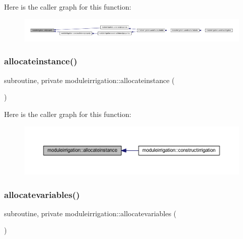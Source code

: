 Here is the caller graph for this function\+:\nopagebreak
\begin{figure}[H]
\begin{center}
\leavevmode
\includegraphics[width=350pt]{namespacemoduleirrigation_a992b40277b2c8bae0924d2f8aa1534ec_icgraph}
\end{center}
\end{figure}
\mbox{\label{namespacemoduleirrigation_abf07b20393874412d5ace40cf035088a}} 
\subsubsection{\texorpdfstring{allocateinstance()}{allocateinstance()}}
{\footnotesize\ttfamily subroutine, private moduleirrigation\+::allocateinstance (\begin{DoxyParamCaption}{ }\end{DoxyParamCaption})\hspace{0.3cm}{\ttfamily [private]}}

Here is the caller graph for this function\+:\nopagebreak
\begin{figure}[H]
\begin{center}
\leavevmode
\includegraphics[width=350pt]{namespacemoduleirrigation_abf07b20393874412d5ace40cf035088a_icgraph}
\end{center}
\end{figure}
\mbox{\label{namespacemoduleirrigation_af29d54feea0c7cea86e11b179c4a36a3}} 
\subsubsection{\texorpdfstring{allocatevariables()}{allocatevariables()}}
{\footnotesize\ttfamily subroutine, private moduleirrigation\+::allocatevariables (\begin{DoxyParamCaption}{ }\end{DoxyParamCaption})\hspace{0.3cm}{\ttfamily [private]}}

